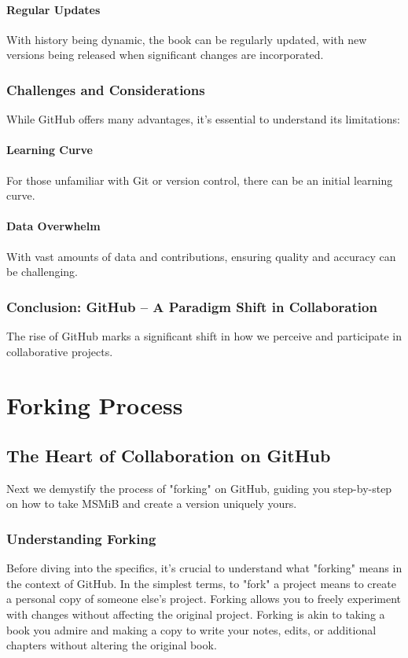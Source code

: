 \documentclass{book}
\begin{document}
\subsubsection*{Regular Updates}
With history being dynamic, the book can be regularly updated, with new versions being released when significant changes are incorporated.

\subsection*{Challenges and Considerations}
While GitHub offers many advantages, it's essential to understand its limitations:

\subsubsection*{Learning Curve}
For those unfamiliar with Git or version control, there can be an initial learning curve.

\subsubsection*{Data Overwhelm}
With vast amounts of data and contributions, ensuring quality and accuracy can be challenging.

\subsection*{Conclusion: GitHub – A Paradigm Shift in Collaboration}
The rise of GitHub marks a significant shift in how we perceive and participate in collaborative projects. 

\chapter{Forking Process}
\section*{The Heart of Collaboration on GitHub}
Next we demystify the process of "forking" on GitHub, guiding you step-by-step on how to take MSMiB and create a version uniquely yours.

\subsection*{Understanding Forking}
Before diving into the specifics, it's crucial to understand what "forking" means in the context of GitHub. In the simplest terms, to "fork" a project means to create a personal copy of someone else's project. Forking allows you to freely experiment with changes without affecting the original project. Forking is akin to taking a book you admire and making a copy to write your notes, edits, or additional chapters without altering the original book.
\end{document}
